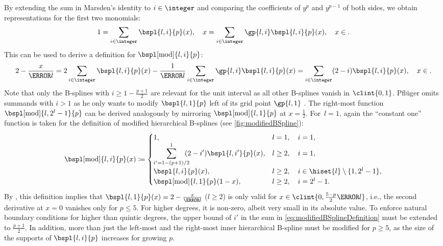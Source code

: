 By extending the sum in Marsden's identity to $i \in \integer$ and
comparing the coefficients of $y^p$ and $y^{p-1}$ of both sides,
we obtain representations for the first two monomials:
\begin{equation}
  1
  = \sum_{i \in \integer} \bspl{l,i}{p}(x),\quad
  x
  = \sum_{i \in \integer} \gp{l,i} \bspl{l,i}{p}(x),\quad
  x \in \real.
\end{equation}
This can be used to derive a definition for $\bspl[\modified]{l,i}{p}$:
\begin{equation}
  \label{eq:modifiedBSplineConstruction}
  2 - \frac{x}{\ms{l}}
  = 2 \sum_{i \in \integer} \bspl{l,i}{p}(x)
  - \frac{1}{\ms{l}} \sum_{i \in \integer} \gp{l,i} \bspl{l,i}{p}(x)
  = \sum_{i \in \integer} (2 - i) \bspl{l,i}{p}(x),\quad
  x \in \real.
\end{equation}
Note that only the B-splines with $i \ge 1 - \tfrac{p+1}{2}$
are relevant for the unit interval
as all other B-splines vanish in $\clint{0, 1}$.
Pflüger omits summands with $i > 1$ as he only wants to modify
$\bspl{l,1}{p}$ left of its grid point $\gp{l,1}$ \cite{Pflueger10Spatially}.
The right-most function $\bspl[\modified]{l,2^l-1}{p}$ can be derived
analogously by mirroring $\bspl[\modified]{l,1}{p}$ at $x = \tfrac{1}{2}$.
\pagebreak%
For~$l = 1$, again the ``constant one'' function is taken for the definition
of modified hierarchical B-splines (see \cref{fig:modifiedBSpline}):
{%
  \setlength{\abovedisplayskip}{9pt}%
  \setlength{\belowdisplayskip}{9pt}%
  \begin{equation}
    \label{eq:modifiedBSplineDefinition}
    \bspl[\modified]{l,i}{p}(x)
    \ceq
    \begin{cases}
      1,&
      l = 1,\quad i = 1,\\
      \displaystyle\sum_{i'=1-(p+1)/2}^1\!\!\!\! (2 - i') \bspl{l,i'}{p}(x),&
      l \ge 2,\quad i = 1,\\
      \bspl{l,i}{p}(x),&
      l \ge 2,\quad i \in \hiset{l} \setminus \{1, 2^l - 1\},\\
      \bspl[\modified]{l,1}{p}(1 - x),&
      l \ge 2,\quad i = 2^l - 1.
    \end{cases}
  \end{equation}%
}%
By ,
this definition implies that
$\bspl{l,1}{p}(x) = 2 - \tfrac{x}{\ms{l}}$ ($l \ge 2$)
is only valid for $x \in \clint{0, \tfrac{5-p}{2} \ms{l}}$, i.e.,
the second derivative at $x = 0$ vanishes only for $p \le 5$.
For higher degrees, it is non-zero, albeit very small
in its absolute value.
To enforce natural boundary conditions
for higher than quintic degrees,
the upper bound of $i'$ in the sum in \eqref{eq:modifiedBSplineDefinition}
must be extended to $\tfrac{p+1}{2}$.
In addition, more than just the left-most and the right-most inner
hierarchical B-spline must be modified for $p \ge 5$,
as the size of the supports of $\bspl{l,i}{p}$ increases
for growing $p$.

